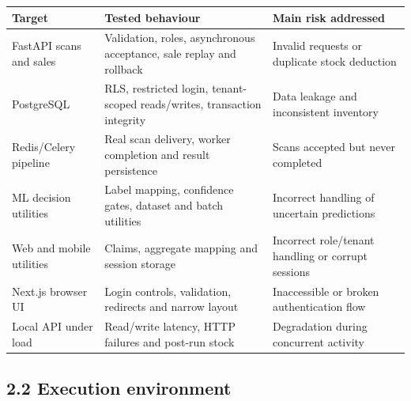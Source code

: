 \documentclass[
  11pt,
]{article}
\newcounter{none} %
\begin{document}
{\def\LTcaptype{none} %
\begin{longtable}[]{@{}
  >{\raggedright\arraybackslash}p{}
  >{\raggedright\arraybackslash}p{}
  >{\raggedright\arraybackslash}p{}@{}}
\toprule\noalign{}
\begin{minipage}[b]{\linewidth}\raggedright
Target
\end{minipage} & \begin{minipage}[b]{\linewidth}\raggedright
Tested behaviour
\end{minipage} & \begin{minipage}[b]{\linewidth}\raggedright
Main risk addressed
\end{minipage} \\
\midrule\noalign{}
\endhead
\bottomrule\noalign{}
\endlastfoot
FastAPI scans and sales & Validation, roles, asynchronous acceptance,
sale replay and rollback & Invalid requests or duplicate stock
deduction \\
PostgreSQL & RLS, restricted login, tenant-scoped reads/writes,
transaction integrity & Data leakage and inconsistent inventory \\
Redis/Celery pipeline & Real scan delivery, worker completion and result
persistence & Scans accepted but never completed \\
ML decision utilities & Label mapping, confidence gates, dataset and
batch utilities & Incorrect handling of uncertain predictions \\
Web and mobile utilities & Claims, aggregate mapping and session storage
& Incorrect role/tenant handling or corrupt sessions \\
Next.js browser UI & Login controls, validation, redirects and narrow
layout & Inaccessible or broken authentication flow \\
Local API under load & Read/write latency, HTTP failures and post-run
stock & Degradation during concurrent activity \\
\end{longtable}
}

\subsection{2.2 Execution environment}\label{execution-environment}
\end{document}
